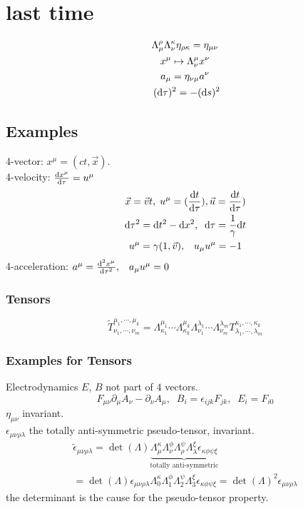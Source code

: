 \section{last time}

\begin{gather}
	\Lambda_\mu^\rho \Lambda_\nu^\kappa \eta_{\rho\kappa} = \eta_{\mu\nu}\\
	x^\mu\mapsto \Lambda^\mu_\nu x^\nu\\
	a_\mu = \eta_{\nu\mu}a^\nu\\\
	(\text d\tau)^2 = -(\text ds)^2
\end{gather}

\subsection{Examples}

4-vector: $x^\mu = (ct, \vec x)$.\\
4-velocity: $\frac{\text dx^\mu}{\text d\tau} = u^\mu$
\begin{gather}
	\vec x = \vec v t,\; u^\mu = (\frac{\text dt}{\text d\tau}), \vec u = \frac{\text dt}{\text d\tau})\\
	\text d\tau^2 = \text dt^2 - \text dx^2,\;\; \text d\tau = \frac{1}{\gamma}\text dt\\
	u^\mu = \gamma(1,\vec v),\;\;\; u_\mu u^\mu = -1
\end{gather}
4-acceleration: $a^\mu = \frac{\text d^2 x^\mu}{\text d\tau^2}, \;\;\; a_\mu u^\mu = 0$\\

\subsubsection{Tensors}
\begin{equation}
	\tilde T^{\mu_1,\cdots,\mu_k}_{\nu_1,\cdots,\nu_m} = \Lambda^{\mu_1}_{\kappa_1}\cdots\Lambda^{\mu_k}_{\kappa_k}\Lambda^{\lambda_1}_{\nu_1}\cdots\Lambda^{\lambda_m}_{\nu_m}T^{\kappa_1,\cdots,\kappa_k}_{\lambda_1,\cdots,\lambda_m}
\end{equation}
\subsubsection{Examples for Tensors}
Electrodynamics $E$, $B$ not part of $4$ vectors.
\begin{equation}
	F_{\mu\nu} \partial_\mu A_\nu - \partial_\nu A_\mu, \;\; B_i = \epsilon_{ijk}F_{jk}, \;\; E_i = F_{i0}
\end{equation}
$\eta_{\mu\nu}$ invariant.\\
$\epsilon_{\mu\nu\rho\lambda}$ the totally anti-symmetric pseudo-tensor, invariant.
\begin{gather}
	\tilde \epsilon_{\mu\nu\rho\lambda}=\det(\Lambda) \underbrace{\Lambda_\mu^\kappa \Lambda_\nu^\phi \Lambda_\rho^\psi \Lambda_\lambda^\xi \epsilon_{\kappa\phi\psi\xi}}_{\text{totally anti-symmetric}}\\
	= \det(\Lambda)\epsilon_{\mu\nu\rho\lambda}\Lambda_0^\kappa \Lambda_1^\phi \Lambda_2^\psi \Lambda_3^\xi \epsilon_{\kappa\phi\psi\xi} = \det(\Lambda)^2 \epsilon_{\mu\nu\rho\lambda}
\end{gather}
the determinant is the cause for the pseudo-tensor property.


